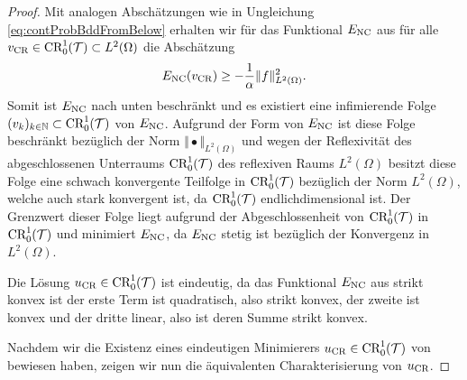\begin{proof}
  Mit analogen Abschätzungen wie in Ungleichung \eqref{eq:contProbBddFromBelow}
  erhalten wir für das Funktional $E_\textup{NC}$ aus  
  für alle $v_\textup{CR}\in\textup{CR}^1_0(\mathcal{T})\subset L^2(\Omega)$ die Abschätzung 
  \begin{equation*}
    E_\textup{NC}(v_\textup{CR}) \geq -\frac{1}{\alpha}\Vert f\Vert_{L^2(\Omega)}^2.
  \end{equation*}
  Somit ist $E_\textup{NC}$ nach unten beschränkt und es existiert eine infimierende
  Folge $(v_k)_{k\in\mathbb{N}} \subset \textup{CR}^1_0(\mathcal{T})$ von $E_\textup{NC}$. Aufgrund der
  Form von $E_\textup{NC}$ ist diese Folge beschränkt bezüglich der Norm
  $\Vert\bullet\Vert_{L^2(\Omega)}$ und wegen der  Reflexivität des
  abgeschlossenen Unterraums $\textup{CR}^1_0(\mathcal{T})$ des reflexiven
  Raums $L^2(\Omega)$ besitzt diese Folge eine schwach konvergente 
  Teilfolge in $\textup{CR}^1_0(\mathcal{T})$
  bezüglich der Norm $L^2(\Omega)$, welche auch stark konvergent ist, da 
  $\textup{CR}^1_0(\mathcal{T})$ endlichdimensional ist. Der Grenzwert dieser Folge
  liegt aufgrund der Abgeschlossenheit von $\textup{CR}^1_0(\mathcal{T})$ in
  $\textup{CR}^1_0(\mathcal{T})$ und minimiert $E_\textup{NC}$, da 
  $E_\textup{NC}$ stetig ist bezüglich der Konvergenz in $L^2(\Omega)$.


  Die Lösung $u_\textup{CR}\in \textup{CR}^1_0(\mathcal{T})$ ist eindeutig, da das Funktional $E_\textup{NC}$
  aus  strikt konvex ist {\color{red} der erste
  Term ist quadratisch, also strikt konvex, der zweite ist konvex und der 
  dritte linear, also ist deren Summe strikt konvex}.

  Nachdem wir die Existenz eines eindeutigen Minimierers
  $u_\textup{CR}\in\textup{CR}^1_0(\mathcal{T})$ von  bewiesen haben,
  zeigen wir nun die äquivalenten Charakterisierung von $u_\textup{CR}$.


\end{proof}

